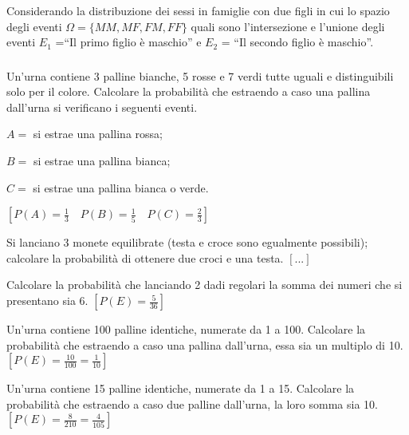 \begin{esercizio}
 \label{ese:9.5}
 Considerando la distribuzione dei sessi in famiglie con due figli in cui lo 
spazio degli eventi $\Omega =\{{MM}, {MF}, {FM}, {FF}\}$ quali sono 
l'intersezione e l'unione degli eventi $E_1$ =``Il primo figlio è maschio'' e 
$E_2$ = ``Il secondo figlio è maschio''.
\end{esercizio}

\subsubsection*{}

\begin{esercizio}[\Ast]
 \label{ese:9.11}
Un'urna contiene 3 palline bianche, 5 rosse e 7 verdi tutte uguali e 
distinguibili solo per il colore. Calcolare la probabilità che estraendo a caso 
una pallina dall'urna si verificano i seguenti eventi.
\begin{itemize*}
\item $ A= $ si estrae una pallina rossa;
\item $ B= $ si estrae una pallina bianca;
\item $ C= $ si estrae una pallina bianca o verde.
\end{itemize*}
\hfill $\left[P(A)=\frac{1}{3}\quad P(B)=\frac{1}{5} \quad 
        P(C)=\frac{2}{3}\right]$
\end{esercizio}

\begin{esercizio}
 \label{ese:9.12}
Si lanciano 3 monete equilibrate (testa e croce sono egualmente possibili); 
calcolare la probabilità di ottenere due croci e una testa.
\hfill $\left[...\right]$
\end{esercizio}

\begin{esercizio}[\Ast]
 \label{ese:9.13}
Calcolare la probabilità che lanciando 2 dadi regolari la somma dei numeri che 
si presentano sia 6.
\hfill $\left[P(E)=\frac 5{36}\right]$
\end{esercizio}

\begin{esercizio}[\Ast]
 \label{ese:9.14}
Un'urna contiene 100 palline identiche, numerate da 1 a 100. Calcolare la 
probabilità che estraendo a caso una pallina dall'urna, essa sia un multiplo di 
10.
\hfill $\left[P(E)=\frac{10}{100}=\frac 1{10}\right]$
\end{esercizio}

\begin{esercizio}[\Ast]
 \label{ese:9.15}
Un'urna contiene 15 palline identiche, numerate da 1 a 15. Calcolare la 
probabilità che estraendo a caso due palline dall'urna, la loro somma sia 10.
\hfill $\left[P(E)=\frac 8{210}=\frac 4{105}\right]$
\end{esercizio}

